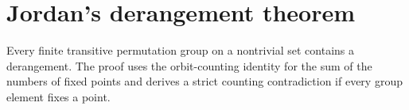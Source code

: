 \section{Jordan's derangement theorem}

\begin{theorem}
\label{thm:jordan-derangement}
\leanok
Every finite transitive permutation group on a nontrivial set contains a derangement. The proof uses the orbit-counting identity for the sum of the numbers of fixed points and derives a strict counting contradiction if every group element fixes a point.
\end{theorem}
